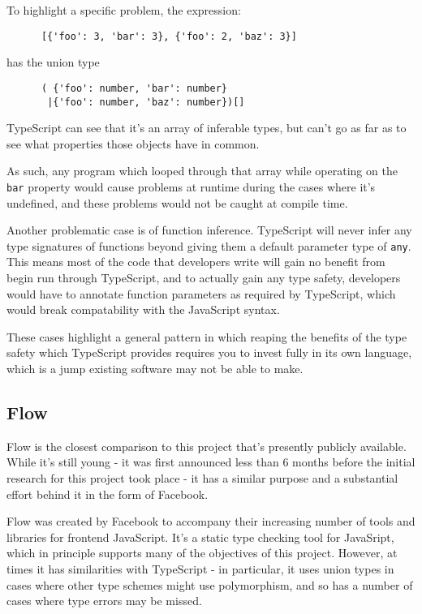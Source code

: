 \documentclass[british, twoside]{bhamthesis}
\theoremstyle{definition}
\begin{document}
    To highlight a specific problem, the expression:
    \begin{lstlisting}
      [{'foo': 3, 'bar': 3}, {'foo': 2, 'baz': 3}]
    \end{lstlisting}
    has the union type
    \begin{lstlisting}
      ( {'foo': number, 'bar': number}
       |{'foo': number, 'baz': number})[]
    \end{lstlisting}

    TypeScript can see that it's an array of inferable types, but can't go as far as to see what properties those objects have in common.

    As such, any program which looped through that array while operating on the \texttt {bar} property would cause problems at runtime during the cases where it's undefined, and these problems would not be caught at compile time.

    Another problematic case is of function inference. TypeScript will never infer any type signatures of functions beyond giving them a default parameter type of \texttt{any}. This means most of the code that developers write will gain no benefit from begin run through TypeScript, and to actually gain any type safety, developers would have to annotate function parameters as required by TypeScript, which would break compatability with the JavaScript syntax.

    These cases highlight a general pattern in which reaping the benefits of the type safety which TypeScript provides requires you to invest fully in its own language, which is a jump existing software may not be able to make.

  \subsection{Flow}
    Flow is the closest comparison to this project that's presently publicly available. While it's still young - it was first announced less than 6 months before the initial research for this project took place - it has a similar purpose and a substantial effort behind it in the form of Facebook.

    Flow was created by Facebook to accompany their increasing number of tools and libraries for frontend JavaScript. It's a static type checking tool for JavaSript, which in principle supports many of the objectives of this project. However, at times it has similarities with TypeScript - in particular, it uses union types in cases where other type schemes might use polymorphism, and so has a number of cases where type errors may be missed.
\end{document}
